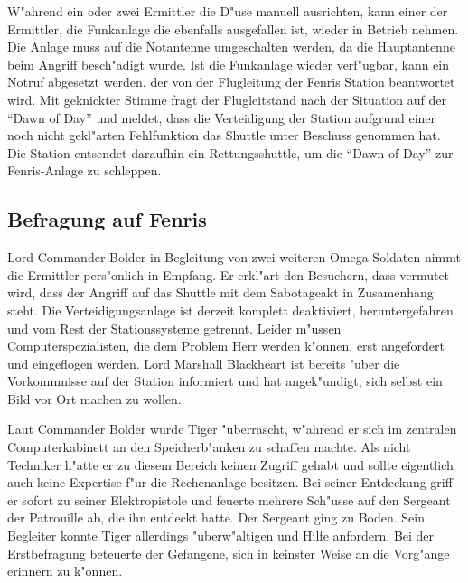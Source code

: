 W"ahrend ein oder zwei Ermittler die D"use manuell ausrichten, kann einer der Ermittler, die Funkanlage die ebenfalls ausgefallen ist, wieder in Betrieb nehmen. Die Anlage muss auf die Notantenne umgeschalten werden, da die Hauptantenne beim Angriff besch"adigt wurde. Ist die Funkanlage wieder verf"ugbar, kann ein Notruf abgesetzt werden, der von der Flugleitung der Fenris Station beantwortet wird. Mit geknickter Stimme fragt der Flugleitstand nach der Situation auf der "`Dawn of Day"' und meldet, dass die Verteidigung der Station aufgrund einer noch nicht gekl"arten Fehlfunktion das Shuttle unter Beschuss genommen hat. Die Station entsendet daraufhin ein Rettungsshuttle, um die "`Dawn of Day"' zur Fenris-Anlage zu schleppen.

\subsection{Befragung auf Fenris}

Lord Commander Bolder in Begleitung von zwei weiteren Omega-Soldaten nimmt die Ermittler pers"onlich in Empfang. Er erkl"art den Besuchern, dass vermutet wird, dass der Angriff auf das Shuttle mit dem Sabotageakt in Zusamenhang steht. Die Verteidigungsanlage ist derzeit komplett deaktiviert, heruntergefahren und vom Rest der Stationssysteme getrennt. Leider m"ussen Computerspezialisten, die dem Problem Herr werden k"onnen, erst angefordert und eingeflogen werden. Lord Marshall Blackheart ist bereits "uber die Vorkommnisse auf der Station informiert und hat angek"undigt, sich selbst ein Bild vor Ort machen zu wollen.

Laut Commander Bolder wurde Tiger "uberrascht, w"ahrend er sich im zentralen Computerkabinett an den Speicherb"anken zu schaffen machte. Als nicht Techniker h"atte er zu diesem Bereich keinen Zugriff gehabt und sollte eigentlich auch  keine Expertise f"ur die Rechenanlage besitzen. Bei seiner Entdeckung griff er sofort zu seiner Elektropistole und feuerte mehrere Sch"usse auf den Sergeant der Patrouille ab, die ihn entdeckt hatte. Der Sergeant ging zu Boden. Sein Begleiter konnte Tiger allerdings "uberw"altigen und Hilfe anfordern. Bei der Erstbefragung beteuerte der Gefangene, sich in keinster Weise an die Vorg"ange erinnern zu k"onnen.

